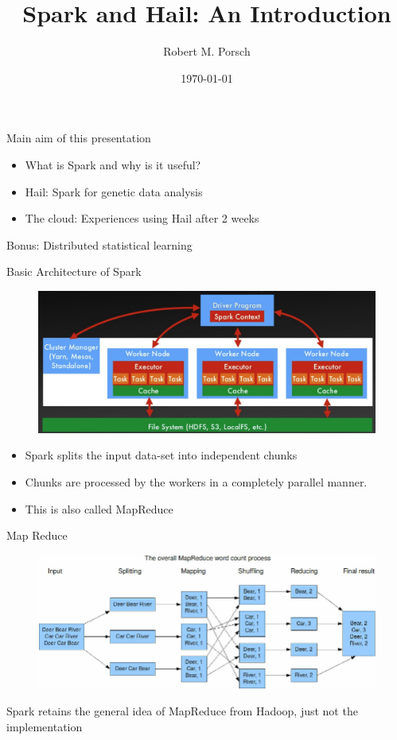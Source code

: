 \documentclass{beamer}
\title{Spark and Hail: An Introduction}
\date{\today}
\author{Robert M. Porsch}
\institute{Center of Genomic Science}
\begin{document}
\maketitle

\begin{frame}
  Main aim of this presentation
  \begin{itemize}
    \item What is Spark and why is it useful?
    \item Hail: Spark for genetic data analysis
    \item The cloud: Experiences using Hail after 2 weeks
  \end{itemize}
  Bonus: Distributed statistical learning
\end{frame}

\begin{frame}{Basic Architecture of Spark}
  \begin{figure}
    \centering
    \includegraphics[scale=0.16]{figure/reduce.png}
  \end{figure}
  \begin{itemize}
    \item Spark splits the input data-set into independent chunks
    \item Chunks are processed by the workers in a completely parallel manner.
    \item This is also called MapReduce
  \end{itemize}
\end{frame}

\begin{frame}[t]{Map Reduce}
  \begin{figure}
    \centering
    \includegraphics[scale=0.35]{figure/map_reduce.png}
  \end{figure}
 Spark retains the general idea of MapReduce from Hadoop, just not the implementation 
\end{frame}
\end{document}
